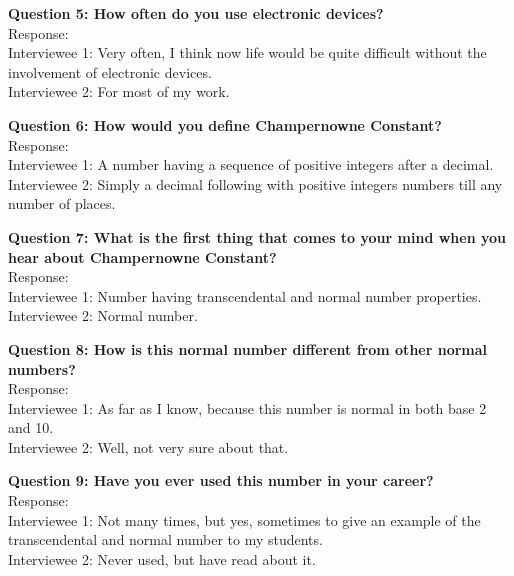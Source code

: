 \documentclass[paper=a4, fontsize=11pt]{report}
\numberwithin{equation}{section}		%
\numberwithin{figure}{section}			%
\numberwithin{table}{section}				%
\begin{document}
\begin{flushleft}
\setlength{\parskip}{\baselineskip}
\textbf{Question 5: How often do you use electronic devices?}
\\Response:
\\Interviewee 1: Very often, I think now life would be quite difficult without the involvement of electronic devices.
\\Interviewee 2: For most of my work.
\\\hrulefill
\end{flushleft}

\begin{flushleft}
\setlength{\parskip}{\baselineskip}
\textbf{Question 6: How would you define Champernowne Constant?}
\\Response:
\\Interviewee 1: A number having a sequence of positive integers after a decimal.
\\Interviewee 2: Simply a decimal following with positive integers numbers till any number of places.
\\\hrulefill
\end{flushleft}

\begin{flushleft}
\setlength{\parskip}{\baselineskip}
\textbf{Question 7: What is the first thing that comes to your mind when you hear about Champernowne Constant?}
\\Response:
\\Interviewee 1: Number having transcendental and normal number properties.
\\Interviewee 2: Normal number.
\\\hrulefill
\end{flushleft}

\begin{flushleft}
\setlength{\parskip}{\baselineskip}
\textbf{Question 8: How is this normal number different from other normal numbers?}
\\Response:
\\Interviewee 1: As far as I know, because this number is normal in both base 2 and 10.
\\Interviewee 2: Well, not very sure about that.
\\\hrulefill
\end{flushleft}

\begin{flushleft}
\setlength{\parskip}{\baselineskip}
\textbf{Question 9: Have you ever used this number in your career?}
\\Response:
\\Interviewee 1: Not many times, but yes, sometimes to give an example of the transcendental and normal number to my students.
\\Interviewee 2: Never used, but have read about it.
\\\hrulefill
\end{flushleft}
\end{document}
